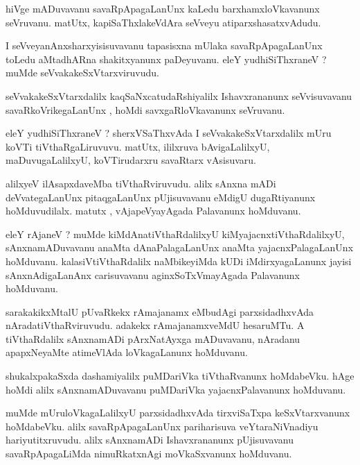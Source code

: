 \documentclass{article}
\begin{document}
\begin{mn}
hiVge mADuvavanu savaRpApagaLanUnx kaLedu barxhamxloVkavanunx seVruvanu. matUtx, kapiSaThxlakeVdAra
seVveyu atiparxshasatxvAdudu.
\end{mn}

\begin{mn}
I seVveyanAnxsharxyisisuvavanu tapasisxna mUlaka savaRpApagaLanUnx toLedu aMtadhARna 
shakitxyanunx paDeyuvanu. eleY yudhiSiThxraneV ? muMde seVvakakeSxVtarxviruvudu.
\end{mn}

\begin{mn}
seVvakakeSxVtarxdalilx  kaqSaNxcatudaRshiyalilx Ishavxrananunx seVvisuvavanu savaRkoVrikegaLanUnx ,
hoMdi savxgaRloVkavanunx seVruvanu.
\end{mn}

\begin{mn}
eleY yudhiSiThxraneV ? sherxVSaThxvAda I seVvakakeSxVtarxdalilx  mUru koVTi tiVthaRgaLiruvuvu. 
matUtx, ililxruva bAvigaLalilxyU, maDuvugaLalilxyU, koVTirudarxru savaRtarx vAsisuvaru.
\end{mn}

\begin{mn}
alilxyeV ilAsapxdaveMba tiVthaRviruvudu. alilx sAnxna mADi deVvategaLanUnx pitaqgaLanUnx 
pUjisuvavanu eMdigU dugaRtiyanunx hoMduvudilalx. matutx , vAjapeVyayAgada Palavanunx hoMduvanu. 
\end{mn}

\begin{mn}
eleY rAjaneV ? muMde kiMdAnatiVthaRdalilxyU kiMyajacnxtiVthaRdalilxyU, sAnxnamADuvavanu anaMta 
dAnaPalagaLanUnx anaMta yajacnxPalagaLanUnx  hoMduvanu. kalasiVtiVthaRdalilx naMbikeyiMda kUDi
iMdirxyagaLanunx jayisi sAnxnAdigaLanAnx carisuvavanu aginxSoTxVmayAgada Palavanunx hoMduvanu.
\end{mn}

\begin{mn}
sarakakikxMtalU pUvaRkekx rAmajanamx eMbudAgi parxsidadhxvAda nAradatiVthaRviruvudu. adakekx 
rAmajanamxveMdU hesaruMTu. A tiVthaRdalilx sAnxnamADi pArxNatAyxga mADuvavanu, nAradanu 
apapxNeyaMte atimeVlAda loVkagaLanunx hoMduvanu.
\end{mn}

\begin{mn}
shukalxpakaSxda dashamiyalilx puMDariVka tiVthaRvanunx  hoMdabeVku. hAge hoMdi alilx 
sAnxnamADuvavanu puMDariVka yajacnxPalavanunx hoMduvanu.
\end{mn}

\begin{mn}
muMde mUruloVkagaLalilxyU parxsidadhxvAda tirxviSaTxpa keSxVtarxvanunx hoMdabeVku. 
alilx savaRpApagaLanUnx pariharisuva veYtaraNiVnadiyu hariyutitxruvudu. alilx sAnxnamADi
Ishavxrananunx pUjisuvavanu savaRpApagaLiMda nimuRkatxnAgi moVkaSxvanunx hoMduvanu.
\end{mn}
\end{document}
